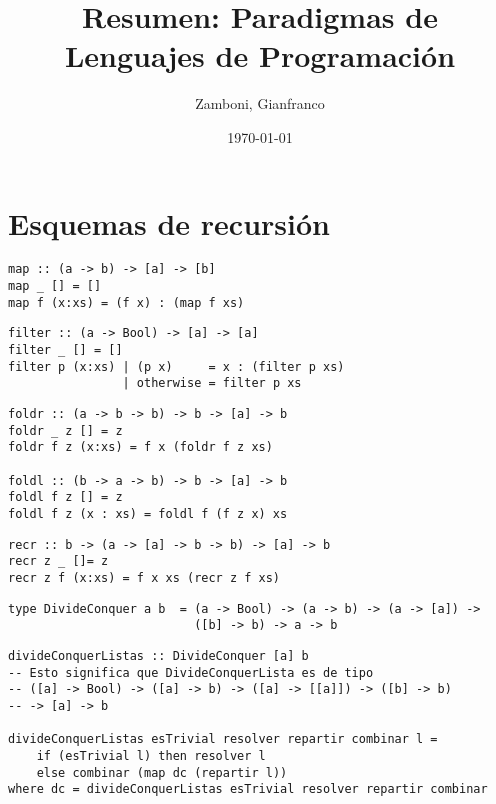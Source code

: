 \documentclass[10pt,a4paper]{article}
\begin{document}
\title{Resumen: Paradigmas de Lenguajes de Programación}

\date{\today}

\author{Zamboni, Gianfranco}

\section{Esquemas de recursión}

\begin{centrado}
	\begin{verbatim}
map :: (a -> b) -> [a] -> [b]
map _ [] = []
map f (x:xs) = (f x) : (map f xs)
	\end{verbatim}
\end{centrado} 

\begin{centrado}
	\begin{verbatim}
filter :: (a -> Bool) -> [a] -> [a]
filter _ [] = []
filter p (x:xs) | (p x)     = x : (filter p xs)
                | otherwise = filter p xs  
	\end{verbatim}
\end{centrado}

\begin{centrado}
	\begin{verbatim}
foldr :: (a -> b -> b) -> b -> [a] -> b
foldr _ z [] = z
foldr f z (x:xs) = f x (foldr f z xs)
		
foldl :: (b -> a -> b) -> b -> [a] -> b
foldl f z [] = z
foldl f z (x : xs) = foldl f (f z x) xs
\end{verbatim}
\end{centrado}

\begin{centrado}
	\begin{verbatim}
recr :: b -> (a -> [a] -> b -> b) -> [a] -> b
recr z _ []= z
recr z f (x:xs) = f x xs (recr z f xs)
	\end{verbatim}
\end{centrado}

\begin{centrado}
	\begin{verbatim}
type DivideConquer a b  = (a -> Bool) -> (a -> b) -> (a -> [a]) -> 
                          ([b] -> b) -> a -> b                         
\end{verbatim}
\end{centrado}
\begin{centrado}
	\begin{verbatim}
divideConquerListas :: DivideConquer [a] b
-- Esto significa que DivideConquerLista es de tipo 
-- ([a] -> Bool) -> ([a] -> b) -> ([a] -> [[a]]) -> ([b] -> b)
-- -> [a] -> b

divideConquerListas esTrivial resolver repartir combinar l =
	if (esTrivial l) then resolver l
	else combinar (map dc (repartir l))
where dc = divideConquerListas esTrivial resolver repartir combinar
                        
	\end{verbatim}
\end{centrado}
\end{document}
